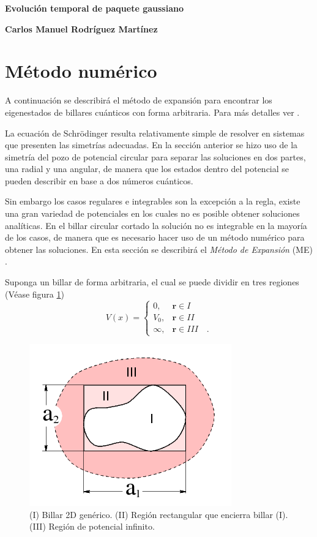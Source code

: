 \documentclass[letterpaper,11pt]{article}
\renewcommand{\vec}[1]{\mathbf{#1}}
\begin{document}
\begin{center}
{\bf \Large Evolución temporal de paquete gaussiano} 
\end{center}

\noindent
{\bf \large Carlos Manuel Rodríguez Martínez} \hspace{5.2cm}

\smallskip


\section{Método numérico}
A continuación se describirá el método de expansión para encontrar los eigenestados de billares cuánticos con forma arbitraria. Para más detalles ver \cite{EM}.

La ecuación de Schrödinger resulta relativamente simple de resolver en sistemas que presenten las simetrías adecuadas. En la sección anterior se hizo uso de la simetría del pozo de potencial circular para separar las soluciones en dos partes, una radial y una angular, de manera que los estados dentro del potencial se pueden describir en base a dos números cuánticos.

Sin embargo los casos regulares e integrables son la excepción a la regla, existe una gran variedad de potenciales en los cuales no es posible obtener soluciones analíticas. En el billar circular cortado la solución no es integrable en la mayoría de los casos, de manera que es necesario hacer uso de un método numérico para obtener las soluciones. En esta sección se describirá el \textit{Método de Expansión} (ME) \cite{EM}.

Suponga un billar de forma arbitraria, el cual se puede dividir en tres regiones (Véase figura \ref{fig:regionesbillar})
\[
	V(x) =
	\begin{cases}
	0, & \vec{r} \in I \\
	V_0, & \vec{r} \in II \\
	\infty, & \vec{r} \in III \quad .
	\end{cases}
\]

\begin{figure}[h!]
\centering
\includegraphics[scale=0.45]{img/bill_cuantico_general}
\caption{(I) Billar 2D genérico. (II) Región rectangular que encierra billar (I). (III) Región de potencial infinito.}
\label{fig:regionesbillar}
\end{figure}
\end{document}
